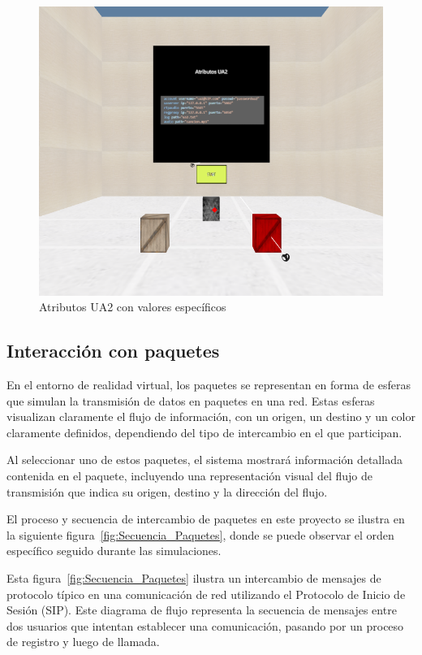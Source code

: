 \documentclass[a4paper, 12pt]{book}
\begin{document}
\begin{figure}
  \centering
  \includegraphics[width=12cm, keepaspectratio]{img/resultados/UA2_Iniciado.png}
  \caption{Atributos UA2 con valores específicos}
  \label{fig:UA2_Iniciado}
\end{figure}

\clearpage
\subsection{Interacción con paquetes}
\label{subsec:objeto_paquetes}
En el entorno de realidad virtual, los paquetes se representan en forma de esferas que simulan la transmisión de datos en paquetes en una red. 
Estas esferas visualizan claramente el flujo de información, con un origen, un destino y un color claramente definidos, 
dependiendo del tipo de intercambio en el que participan.

\bigskip

Al seleccionar uno de estos paquetes, el sistema mostrará información detallada contenida en el paquete, 
incluyendo una representación visual del flujo de transmisión que indica su origen, destino y la dirección del flujo.

\bigskip

El proceso y secuencia de intercambio de paquetes en este proyecto se ilustra en la siguiente figura~\ref{fig:Secuencia_Paquetes}, donde se puede observar el orden 
específico seguido durante las simulaciones.

\bigskip

Esta figura~\ref{fig:Secuencia_Paquetes} ilustra un intercambio de mensajes de protocolo típico en una comunicación de red utilizando el Protocolo de Inicio de Sesión (SIP). 
Este diagrama de flujo representa la secuencia de mensajes entre dos usuarios que intentan establecer una comunicación, 
pasando por un proceso de registro y luego de llamada.
\end{document}
